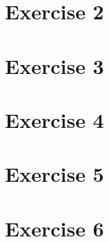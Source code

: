 \documentclass{article}
\begin{document}
\section*{Exercise 2}

\section*{Exercise 3}

\section*{Exercise 4}

\section*{Exercise 5}

\section*{Exercise 6}
\end{document}
